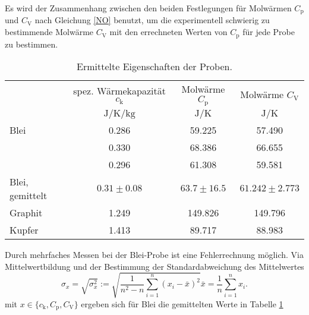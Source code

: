 Es wird der Zusammenhang zwischen den beiden Festlegungen für Molwärmen $C_\text{p}$ und $C_\text{V}$ nach Gleichung \eqref{NO} benutzt, um
die experimentell schwierig zu bestimmende Molwärme $C_\text{V}$ mit den errechneten Werten von $C_\text{p}$ für jede Probe zu bestimmen.
\begin{table}[htbp]
	\centering
	\begin{tabular}{lccc}
		\toprule
		&{spez. Wärmekapazität $c_\text{k}$}& {Molwärme $C_\text{p}$}  &{Molwärme $C_\text{V}$}\\
		&{$\si{\joule\per\kelvin\per\kilo\gram}$}  &{$\si{\joule\per\kelvin}$}& {$\si{\joule\per\kelvin}$}\\
		\midrule
		{Blei}	&0.286	&59.225	& 57.490\\
				&0.330	&68.386	& 66.655\\
				&0.296	&61.308	& 59.581\\
		{Blei, gemittelt}	&$0.31\pm0.08$	&$63.7\pm16.5$	&$61.242\pm2.773$\\
		{Graphit}&1.249 &149.826& 149.796\\
		{Kupfer}&1.413	&89.717	& 88.983\\
		\bottomrule
	\end{tabular}
	\caption{Ermittelte Eigenschaften der Proben.}
	\label{wert:proben}
\end{table}
Durch mehrfaches Messen bei der Blei-Probe ist eine Fehlerrechnung möglich.
Via Mittelwertbildung und der Bestimmung der Standardabweichung des Mittelwertes
\begin{subequations}
	\begin{equation}
		\sigma_x = \sqrt{\sigma_x^2} := \sqrt{\frac{1}{n^2-n} \sum_{i=1}^n{(x_i-\bar{x})^2}}
	\end{equation}
	\begin{equation}
		\bar{x} = \frac{1}{n} \sum_{i=1}^n{x_i}.
	\end{equation}
\end{subequations}
mit $x\in\{c_\mathup{k},C_\mathup{p},C_\mathup{V}\}$ ergeben sich für Blei die gemittelten Werte in Tabelle \ref{wert:proben}

